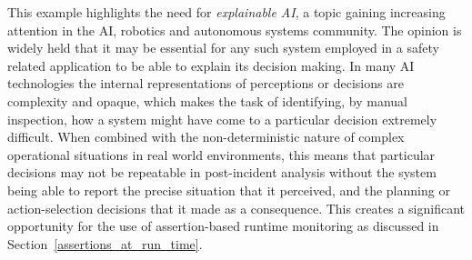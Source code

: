 This example highlights the need for \emph{explainable AI}, a topic gaining increasing attention in the AI, robotics and autonomous systems community. The opinion is widely held \cite{deeks2019judicial, o2019legal, wortham2020transparency} that it may be essential for any such system employed in a safety related application to be able to explain its decision making.
%
In many AI technologies the internal representations of perceptions or decisions are complexity and opaque, which makes the task of identifying, by manual inspection, how a system might have come to a particular decision extremely difficult. When combined with the non-deterministic nature of complex operational situations in real world environments, this means that particular decisions may not be repeatable in post-incident analysis without the system being able to report the precise situation that it perceived, and the planning or action-selection decisions that it made as a consequence. 
%
This creates a significant opportunity for the use of assertion-based runtime monitoring as discussed in Section~\ref{assertions_at_run_time}.

